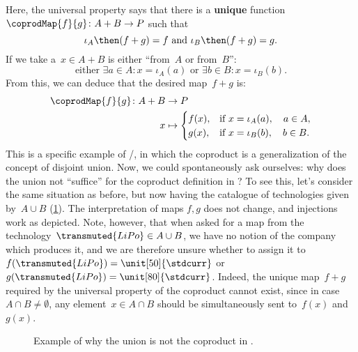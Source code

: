 \begin{example}
  Here, the universal property says that there is a \textbf{unique} function~$\coprodMap{f}{g}\colon A+B\to P$ such that
  \begin{equation*}
    \iota_A\then (f+ g)=f \text{ and }\iota_B\then (f+ g)=g.
  \end{equation*}
  If we take a~$x\in A+B$ is either ``from~$A$ or from~$B$'':
  \begin{equation*}
    \text{either } \exists a\in A:x=\iota_A(a) \text{ or }\exists b\in B:x=\iota_B(b).
  \end{equation*}
  From this, we can deduce that the desired map~$f+g$ is:
  \begin{equation*}
    \begin{aligned}
      \coprodMap{f}{g} \colon  A + B &\to P \\
      x &   \mapsto
      \begin{cases}
        f(x),& \text{if } x=\iota_A(a),\quad a \in A, \\
        g(x),& \text{if } x=\iota_B(b),\quad b \in B.
      \end{cases}
    \end{aligned}
  \end{equation*}
  This is a specific example of \Set/\FinSet, in which the coproduct is a generalization of the concept of disjoint union. Now, we could spontaneously ask ourselves: why does the union not ``suffice'' for the coproduct definition in \Set? To see this, let's consider the same situation as before, but now having the catalogue of technologies given by~$A\cup B$ (\cref{fig:coprod_batteries_2}). The interpretation of maps $f,g$ does not change, and injections work as depicted. Note, however, that when asked for a map from the technology~$\transmuted{LiPo}\in A\cup B$, we have no notion of the company which produces it, and we are therefore unsure whether to assign it to~$f(\transmuted{LiPo})=\unit[50]{\stdcurr}$ or~$g(\transmuted{LiPo})=\unit[80]{\stdcurr}$. Indeed, the unique map~$f+g$ required by the universal property of the coproduct cannot exist, since in case~$A\cap B\neq \emptyset$, any element~$x\in A\cap B$ should be simultaneously sent to~$f(x)$ and~$g(x)$.

  \begin{figure}[h!]
    \centering
    \caption{Example of why the union is not the coproduct in \Set.}
    \label{fig:coprod_batteries_2}
  \end{figure}
\end{example}



